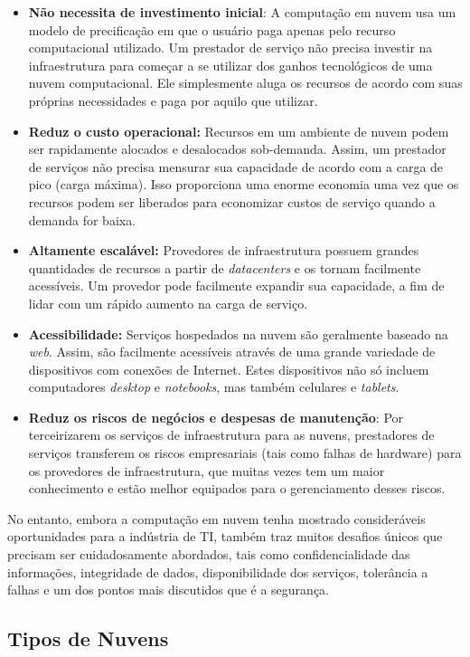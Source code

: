 \begin{itemize}
	\item \textbf{Não necessita de investimento inicial}: A computação em nuvem usa um modelo de precificação em que o usuário paga apenas pelo recurso computacional utilizado. Um prestador de serviço não precisa investir na infraestrutura para começar a se utilizar dos ganhos tecnológicos de uma nuvem computacional. Ele simplesmente aluga os recursos de acordo com suas próprias necessidades e paga por aquilo que utilizar.
	\item \textbf{Reduz o custo operacional:} Recursos em um ambiente de nuvem podem ser rapidamente alocados e desalocados sob-demanda. Assim, um prestador de serviços não precisa  mensurar sua capacidade de acordo com a carga de pico (carga máxima). Isso proporciona uma enorme economia uma vez que os recursos podem ser liberados para economizar custos de serviço quando a demanda for baixa.	
	\item \textbf{Altamente escalável:} Provedores de infraestrutura possuem grandes quantidades de recursos a partir de \textit{datacenters} e os tornam facilmente acessíveis. Um provedor pode facilmente expandir sua capacidade, a fim de lidar com um rápido aumento na carga de serviço.	
	\item \textbf{Acessibilidade:} Serviços hospedados na nuvem são geralmente baseado na \textit{web}. Assim, são facilmente acessíveis através de uma grande variedade de dispositivos com conexões de Internet. Estes dispositivos não só incluem computadores \textit{desktop} e \textit{notebooks}, mas também celulares e \textit{tablets}.
	\item \textbf{Reduz os riscos de negócios e despesas de manutenção}: Por terceirizarem os serviços de infraestrutura para as nuvens, prestadores de serviços transferem os riscos empresariais (tais como falhas de hardware) para os provedores de infraestrutura, que muitas vezes tem um maior conhecimento e estão melhor equipados para o gerenciamento desses riscos.
\end{itemize}

No entanto, embora a computação em nuvem tenha mostrado consideráveis oportunidades para a indústria de TI, também traz muitos desafios únicos que precisam ser cuidadosamente abordados, tais como confidencialidade das informações, integridade de dados, disponibilidade dos serviços, tolerância a falhas e um dos pontos mais discutidos que é a segurança. 

\subsection{Tipos de Nuvens} \label{cap2sec2subsec2}

